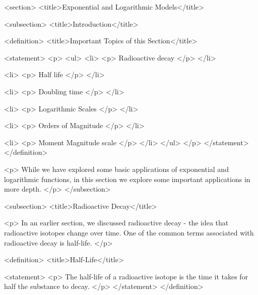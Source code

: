 <section>
    <title>Exponential and Logarithmic Models</title>

    <subsection>
        <title>Introduction</title>

        <definition>
            <title>Important Topics of this Section</title>

            <statement>
                <p>
                    <ul>
                        <li>
                            <p>
                                Radioactive decay
                            </p>
                        </li>

                        <li>
                            <p>
                                Half life
                            </p>
                        </li>

                        <li>
                            <p>
                                Doubling time
                            </p>
                        </li>

                        <li>
                            <p>
                                Logarithmic Scales
                            </p>
                        </li>

                        <li>
                            <p>
                                Orders of Magnitude
                            </p>
                        </li>

                        <li>
                            <p>
                                Moment Magnitude scale
                            </p>
                        </li>
                    </ul>
                </p>
            </statement>
        </definition>

        <p>
            While we have explored some basic applications of exponential and logarithmic functions, in this section we explore some important applications in more depth.
        </p>
    </subsection>


    <subsection>
        <title>Radioactive Decay</title>

        <p>
            In an earlier section, we discussed radioactive decay - the idea that radioactive isotopes change over time.
            One of the common terms associated with radioactive decay is half-life.
        </p>

        <definition>
            <title>Half-Life</title>

            <statement>
                <p>
                    The half-life of a radioactive isotope is the time it takes for half the substance to decay.
                </p>
            </statement>
        </definition>

